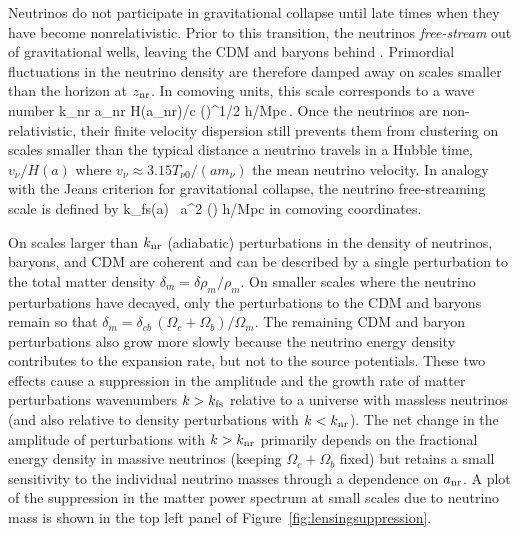 Neutrinos do not participate in gravitational collapse until late times when they have become nonrelativistic. Prior to this transition, the neutrinos {\em free-stream} out of gravitational wells, leaving the CDM and baryons behind  \cite{Bond:1983hb, Ma:1996za, Hu:1997vi, Hu:1997mj}. Primordial fluctuations in the neutrino density are therefore damped away on scales smaller than the horizon at $z_{\rm nr}$. In comoving units, this scale corresponds to a wave number
\beq
k_{\rm nr} \equiv a_{\rm nr} H(a_{\rm nr})/c  \left(\right)^{1/2} h/{\rm Mpc}\,.
\eeq
Once the neutrinos are non-relativistic, their finite velocity dispersion still prevents them from clustering on scales smaller than the typical distance a neutrino travels in a Hubble time, $v_\nu /H(a)$ where $v_\nu \approx 3.15 T_{\nu 0}/(a m_\nu)$ the mean neutrino velocity. In analogy with the Jeans criterion for gravitational collapse, the neutrino free-streaming scale is defined by \cite{Bond:1983hb, Lesgourgues:2006nd}
\beq
k_{\rm fs}(a) \equiv {} \, a^2 \left(\right) h/{\rm Mpc}
\eeq
in comoving coordinates. 

On scales larger than $k_{\rm nr}$ (adiabatic) perturbations in the density of neutrinos, baryons, and CDM are coherent and can be described by a single perturbation to the total matter density $\delta_m= \delta \rho_m/\rho_m$. On smaller scales where the neutrino perturbations have decayed, only the perturbations to the CDM and baryons remain so that $\delta_{m} = \delta_{cb}\, (\Omega_{c} + \Omega_b)/\Omega_m $. The remaining CDM and baryon perturbations also grow more slowly because the neutrino energy density contributes to the expansion rate, but not to the source potentials. These two effects cause a suppression in the amplitude and the growth rate of matter perturbations wavenumbers $k > k_{\rm fs}$ relative to a universe with massless neutrinos (and also relative to density perturbations with $k<k_{\rm nr}$). The net change in the amplitude of perturbations with $k > k_{\rm nr}$ primarily depends on the fractional energy density in massive neutrinos (keeping $\Omega_c+\Omega_b$ fixed) but retains a small sensitivity to the individual neutrino masses through a dependence on $a_{\rm nr}$. A plot of the suppression in the matter power spectrum at small scales due to neutrino mass is shown in the top left panel of Figure~\ref{fig:lensingsuppression}.



